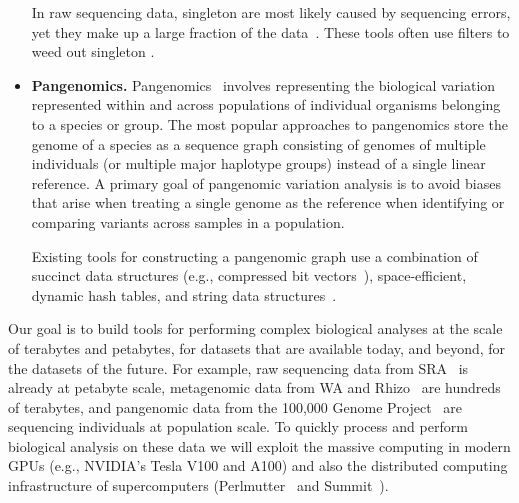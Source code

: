\begin{itemize}[leftmargin=*]
In raw sequencing data, singleton \kmers are most likely caused by sequencing errors, yet they make up a large fraction of the data~\cite{solomon2016fast,MarccaisKi11}. These tools often use filters to weed out singleton \kmers.



\item \textbf{Pangenomics.}
Pangenomics~\cite{garrison2018variation} involves representing the biological variation represented within and across populations of individual organisms belonging to a species or group.  The most popular approaches to pangenomics store the genome of a species as a sequence graph consisting of genomes of multiple individuals (or multiple major haplotype groups) instead of a single linear reference. A primary goal of pangenomic variation analysis is to avoid biases that arise when treating a single genome as the reference when identifying or comparing variants across samples in a population.

Existing tools for constructing a pangenomic graph use a combination of succinct data structures (e.g., compressed bit vectors~\cite{garrison2018variation}), space-efficient, dynamic hash tables, and string data structures~\cite{pandey2021variantstore}.


\end{itemize}


Our goal 
is to build tools for performing complex biological analyses at the scale of terabytes and petabytes, for datasets that are available today, and beyond, for the datasets of the future. For example, raw sequencing data from SRA~\cite{kodama2012sequence} is already at petabyte scale, metagenomic data from WA and Rhizo~\cite{hofmeyr2020terabase} are hundreds of terabytes, and pangenomic data from the 100,000 Genome Project~\cite{1002021100} are sequencing individuals at population scale. To quickly process and perform biological analysis on these data we will exploit the massive computing in modern GPUs (e.g., NVIDIA's Tesla V100 and A100) and also the distributed computing infrastructure of supercomputers (Perlmutter~\cite{perlmutter} and Summit~\cite{summit}).

